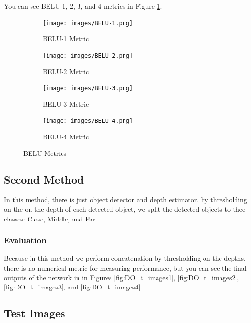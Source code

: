 \documentclass[a4paper, openany]{book}
\begin{document}
You can see BELU-1, 2, 3, and 4 metrics in Figure \ref{fig:BELU}.
\begin{figure}[ht]
  \centering
  
    \begin{subfigure}[b]{0.9\linewidth}
    \texttt{[image: images/BELU-1.png]}
    \caption{BELU-1 Metric}
  \end{subfigure}
  \begin{subfigure}[b]{0.9\linewidth}
    \texttt{[image: images/BELU-2.png]}
    \caption{BELU-2 Metric}
  \end{subfigure}
      \begin{subfigure}[b]{0.9\linewidth}
    \texttt{[image: images/BELU-3.png]}
    \caption{BELU-3 Metric}
  \end{subfigure}
  \begin{subfigure}[b]{0.9\linewidth}
    \texttt{[image: images/BELU-4.png]}
    \caption{BELU-4 Metric}
  \end{subfigure}
  
      \caption{BELU Metrics}
  \label{fig:BELU}
\end{figure}


\subsection{Second Method}
	\vspace{0.3cm}

In this method, there is just object detector and depth estimator. by thresholding on the on the depth of each detected object, we split the detected objects to thee classes: Close, Middle, and Far.

\subsubsection{Evaluation}
	\vspace{0.3cm}

Because in this method we perform concatenation by thresholding on the depths, there is no numerical metric for measuring performance, but you can see the final outputs of the network in in Figures \ref{fig:DO_t_images1}, \ref{fig:DO_t_images2}, \ref{fig:DO_t_images3}, and \ref{fig:DO_t_images4}.


\newpage

\subsection{Test Images}
	\vspace{0.3cm}
	
\end{document}
